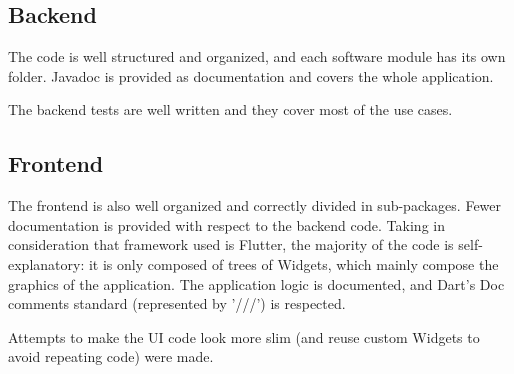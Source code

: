 \subsection{Backend}

The code is well structured and organized, and each software module has its own folder.
Javadoc is provided as documentation and covers the whole application.

The backend tests are well written and they cover most of the use cases.

\subsection{Frontend}

The frontend is also well organized and correctly divided in sub-packages.
Fewer documentation is provided with respect to the backend code. Taking in consideration that framework used is Flutter, the majority of the code is self-explanatory: it is only composed of trees of Widgets, which mainly compose the graphics of the application. The application logic is documented, and Dart's Doc comments standard (represented by '///') is respected.

Attempts to make the UI code look more slim (and reuse custom Widgets to avoid repeating code) were made.





